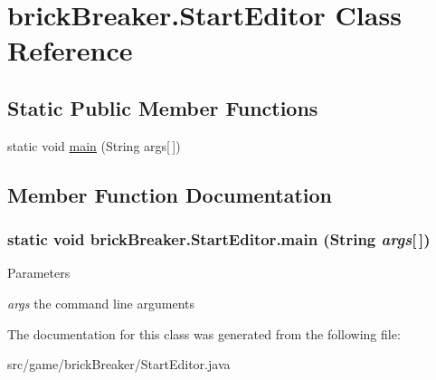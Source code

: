 \hypertarget{classbrick_breaker_1_1_start_editor}{
\section{brickBreaker.StartEditor Class Reference}
\label{classbrick_breaker_1_1_start_editor}
}
\subsection*{Static Public Member Functions}
\begin{DoxyCompactItemize}
\item 
static void \hyperlink{classbrick_breaker_1_1_start_editor_a2e6924e9e8162a7b1976ce5d01478bee}{main} (String args\mbox{[}$\,$\mbox{]})
\end{DoxyCompactItemize}


\subsection{Member Function Documentation}
\hypertarget{classbrick_breaker_1_1_start_editor_a2e6924e9e8162a7b1976ce5d01478bee}{
\subsubsection[{main}]{\setlength{\rightskip}{0pt plus 5cm}static void brickBreaker.StartEditor.main (String {\em args}\mbox{[}$\,$\mbox{]})}}
\label{classbrick_breaker_1_1_start_editor_a2e6924e9e8162a7b1976ce5d01478bee}

\begin{DoxyParams}{Parameters}
\item[{\em args}]the command line arguments \end{DoxyParams}


The documentation for this class was generated from the following file:\begin{DoxyCompactItemize}
\item 
src/game/brickBreaker/StartEditor.java\end{DoxyCompactItemize}
